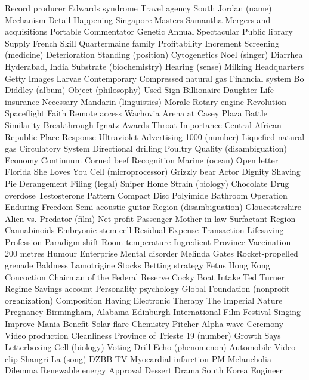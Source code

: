 Record producer  Edwards syndrome  Travel agency  
South  Jordan (name)  Mechanism  
Detail  Happening  Singapore Masters  
Samantha  Mergers and acquisitions  Portable  
Commentator  Genetic  Annual  
Spectacular  Public library  Supply  
French  Skill  Quartermaine family  
Profitability  Increment  Screening (medicine)  
Deterioration  Standing (position)  Cytogenetics  
Noel (singer)  Diarrhea  Hyderabad, India  
Substrate (biochemistry)  Hearing (sense)  Milking  
Headquarters  Getty Images  Larvae  
Contemporary  Compressed natural gas  Financial system  
Bo Diddley (album)  Object (philosophy)  Used  
Sign  Billionaire  Daughter  
Life insurance  Necessary  Mandarin (linguistics)  
Morale  Rotary engine  Revolution  
Spaceflight  Faith  Remote access  
Wachovia Arena at Casey Plaza  Battle  Similarity  
Breakthrough  Ignatz Awards  Throat  
Importance  Central African Republic  Place  
Response  Ultraviolet  Advertising  
1000 (number)  Liquefied natural gas  Circulatory System  
Directional drilling  Poultry  Quality (disambiguation)  
Economy  Continuum  Corned beef  
Recognition  Marine (ocean)  Open letter  
Florida  She Loves You  Cell (microprocessor)  
Grizzly bear  Actor  Dignity  
Shaving  Pie  Derangement  
Filing (legal)  Sniper  Home  
Strain (biology)  Chocolate  Drug overdose  
Testosterone  Pattern  Compact Disc  
Polyimide  Bathroom  Operation Enduring Freedom  
Semi-acoustic guitar  Region (disambiguation)  Gloucestershire  
Alien vs. Predator (film)  Net profit  Passenger  
Mother-in-law  Surfactant  Region  
Cannabinoids  Embryonic stem cell  Residual  
Expense  Transaction  Lifesaving  
Profession  Paradigm shift  Room temperature  
Ingredient  Province  Vaccination  
200 metres  Humour  Enterprise  
Mental disorder  Melinda Gates  Rocket-propelled grenade  
Baldness  Lamotrigine  Stocks  
Betting strategy  Fetus  Hong Kong  
Concoction  Chairman of the Federal Reserve  Cocky  
Boat  Intake  Ted Turner  
Regime  Savings account  Personality psychology  
Global  Foundation (nonprofit organization)  Composition  
Having  Electronic  Therapy  
The Imperial  Nature  Pregnancy  
Birmingham, Alabama  Edinburgh International Film Festival  Singing  
Improve  Mania  Benefit  
Solar flare  Chemistry  Pitcher  
Alpha wave  Ceremony  Video production  
Cleanliness  Province of Trieste  19 (number)  
Growth  Says  Letterboxing  
Cell (biology)  Voting  Drill  
Echo (phenomenon)  Automobile  Video clip  
Shangri-La (song)  DZBB-TV  Myocardial infarction  
PM  Melancholia  Dilemma  
Renewable energy  Approval  Dessert  
Drama  South Korea  Engineer  

